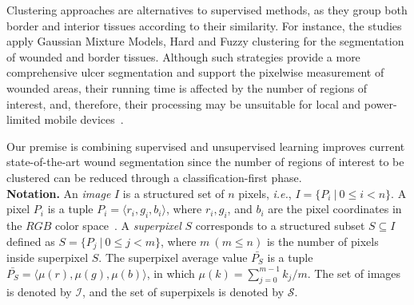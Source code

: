 Clustering approaches are alternatives to supervised methods, as they group both border and interior tissues according to their similarity.
For instance, the studies~\cite{Maity2018,Dhane2017} apply Gaussian Mixture Models, Hard and Fuzzy clustering for the segmentation of wounded and border tissues.
Although such strategies provide a more comprehensive ulcer segmentation and support the pixelwise measurement of wounded areas, their running time is affected by the number of regions of interest, and, therefore, their processing may be unsuitable for local and power-limited mobile devices~\cite{Deserno2018}.

Our premise is combining supervised and unsupervised learning improves current state-of-the-art wound segmentation since the number of regions of interest to be clustered can be reduced through a classification-first phase.\\

\noindent 
\textbf{Notation.}
An \textit{image} $I$ is a structured set of $n$ pixels, \textit{i.e.}, $I = \{P_{i} ~|~ 0 \leq i < n \}$.
A pixel $P_i$ is a tuple $P_{i} =  \langle r_{i}, g_{i}, b_{i} \rangle$, where $r_{i}, g_{i}$, and $b_{i}$ are the pixel coordinates in the $RGB$ color space~\cite{Sonka2014}.
A \textit{superpixel} $S$ corresponds to a structured subset $S \subseteq I$ defined as $S = \{P_{j} ~|~ 0 \leq j < m \}$, where $m ~(m \leq n)$ is the number of pixels inside superpixel $S$. 
The superpixel average value $\bar{P_S}$ is a tuple $\bar{P_S} = \langle \mu(r), \mu(g), \mu(b)\rangle$, in which $\mu(k) = \sum_{j = 0}^{m-1} k_j/m$.
The set of images is denoted by $\mathcal{I}$, and the set of superpixels is denoted by $\mathcal{S}$.\\

